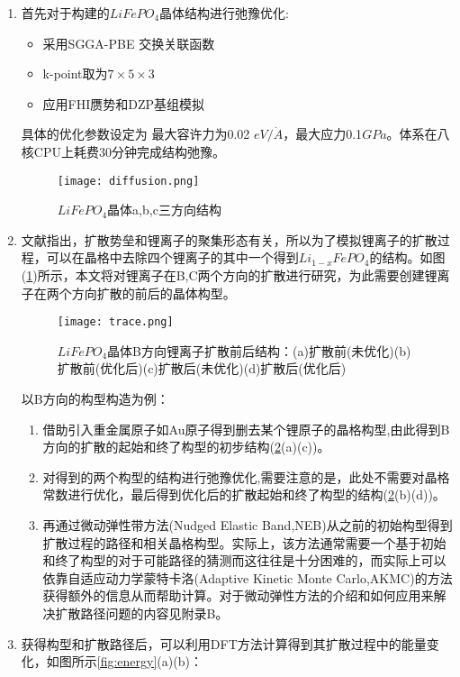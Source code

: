 \begin{enumerate}
	\item 首先对于构建的$LiFePO_4$晶体结构进行弛豫优化:
	\begin{itemize}
		\item 采用SGGA-PBE 交换关联函数
		\item k-point取为$7 \times 5 \times 3$
		\item 应用FHI赝势和DZP基组模拟
	\end{itemize}
	具体的优化参数设定为 最大容许力为0.02 $eV/\dot{A}$，最大应力0.1$ GPa$。体系在八核CPU上耗费30分钟完成结构弛豫。
	\begin{figure}
	\centering   
	\texttt{[image: diffusion.png]}
	\caption{$LiFePO_4$晶体a,b,c三方向结构\cite{Ouyang2004First}} 
	\label{fig:diffusion}
	\end{figure}
	\item 文献指出，扩散势垒和锂离子的聚集形态有关\cite{Ouyang2004First}，所以为了模拟锂离子的扩散过程，可以在晶格中去除四个锂离子的其中一个得到$Li_{1-x}FePO_4$的结构。如图(\ref{fig:diffusion})所示，本文将对锂离子在B,C两个方向的扩散进行研究，为此需要创建锂离子在两个方向扩散的前后的晶体构型。\\
	\begin{figure}
	\centering   
	\texttt{[image: trace.png]}
	\caption{$LiFePO_4$晶体B方向锂离子扩散前后结构：(a)扩散前(未优化)\quad(b)扩散前(优化后)\quad(c)扩散后(未优化)\quad (d)扩散后(优化后)}
	\label{fig:trace}
	\end{figure}
	以B方向的构型构造为例：
	\begin{enumerate}
		\item 借助引入重金属原子如Au原子得到删去某个锂原子的晶格构型,由此得到B方向的扩散的起始和终了构型的初步结构(\ref{fig:trace}(a)(c))。
		\item 对得到的两个构型的结构进行弛豫优化,需要注意的是，此处不需要对晶格常数进行优化，最后得到优化后的扩散起始和终了构型的结构(\ref{fig:trace}(b)(d))。
		\item 再通过微动弹性带方法(Nudged Elastic Band,NEB)从之前的初始构型得到扩散过程的路径和相关晶格构型\cite{Smidstrup2014Improved,Zhou2004Misfit,Kellogg1990Surface}。实际上，该方法通常需要一个基于初始和终了构型的对于可能路径的猜测而这往往是十分困难的，而实际上可以依靠自适应动力学蒙特卡洛(Adaptive Kinetic Monte Carlo,AKMC)的方法获得额外的信息从而帮助计算\cite{Xu2008Adaptive,Henkelman1999A}。对于微动弹性方法的介绍和如何应用来解决扩散路径问题的内容见附录B。
	\end{enumerate}
	\item 获得构型和扩散路径后，可以利用DFT方法计算得到其扩散过程中的能量变化，如图所示\ref{fig:energy}(a)(b)：

\end{enumerate}
